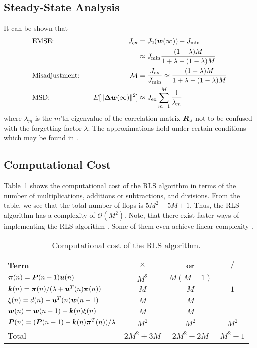 \subsection{Steady-State Analysis}
It can be shown that \cite[p.~510]{Sayed2003}
\begin{alignat}{2}
  &\text{EMSE:}&\quad J_\textup{ex} &= J_2(\boldsymbol{w}(\infty))-J_\textup{min}\notag\\
  & &\quad &\approx J_\textup{min}\frac{(1-\lambda)M}{1+\lambda-(1-\lambda)M}\\
  &\text{Misadjustment:}&\quad \mathcal{M} &= \frac{ J_\textup{ex}}{J_\textup{min}} \approx \frac{(1-\lambda)M}{1+\lambda-(1-\lambda)M}\\
  &\text{MSD:} &\quad E[\|\boldsymbol{\Delta}\boldsymbol{w}(\infty)\|^2] &\approx J_\textup{ex}\sum_{m=1}^M\frac{1}{\lambda_m}
\end{alignat}
where $\lambda_m$ is the $m$'th eigenvalue of the correlation matrix $\boldsymbol{R}_u$ not to be confused with the forgetting factor $\lambda$. The approximations hold under certain conditions which may be found in \cite[pp.~508--510]{Sayed2003}.

\subsection{Computational Cost}
Table~\ref{tab:comp_cost_rls} shows the computational cost of the RLS algorithm in terms of the number of multiplications, additions or subtractions, and divisions. From the table, we see that the total number of flops is $5M^2+5M+1$. Thus, the RLS algorithm has a complexity of $\mathcal{O}(M^2)$. Note, that there exist faster ways of implementing the RLS algorithm \cite[pp.~247]{Sayed2003}. Some of them even achieve linear complexity \cite{Slock1991}.
\begin{table}[htbp]
  \centering
  \begin{tabular}{l c c c}
    \toprule
    Term & $\times$ & $+$ or $-$ & $/$\\
    \midrule
    $\boldsymbol{\pi}(n)=\boldsymbol{P}(n-1)\boldsymbol{u}(n)$ & $M^2$ & $M(M-1)$ &\\
    $\boldsymbol{k}(n) = \boldsymbol{\pi}(n)/(\lambda+\boldsymbol{u}^T(n)\boldsymbol{\pi}(n))$ & $M$ & $M$ & $1$\\
    $\xi(n)=d(n)-\boldsymbol{u}^T(n)\boldsymbol{w}(n-1)$ & $M$ & $M$ & \\
    $\boldsymbol{w}(n) = \boldsymbol{w}(n-1)+\boldsymbol{k}(n)\xi(n)$ & $M$ & $M$ & \\
    $\boldsymbol{P}(n) = (\boldsymbol{P}(n-1)-\boldsymbol{k}(n)\boldsymbol{\pi}^T(n))/\lambda$ & $M^2$ & $M^2$ & $M^2$ \\
    \midrule
    Total & $2M^2+3M$ & $2M^2+2M$ & $M^2+1$\\
    \bottomrule
  \end{tabular}
  \caption{Computational cost of the RLS algorithm.}
  \label{tab:comp_cost_rls}
\end{table}
